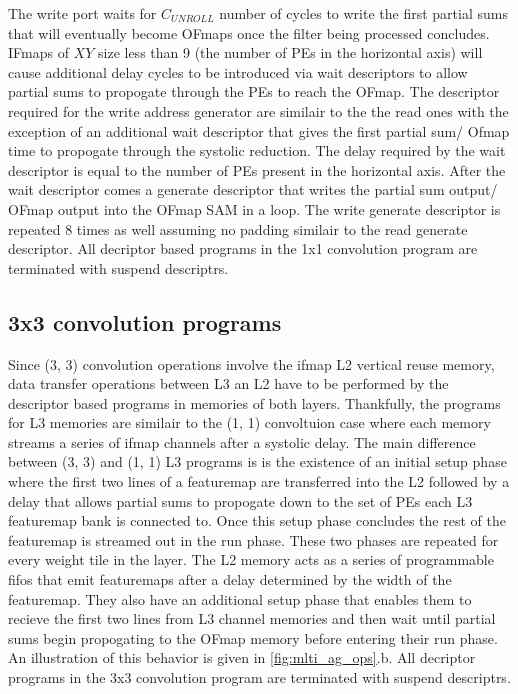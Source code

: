 The write port waits for $C_{UNROLL}$ number of cycles to write the first
partial sums that will eventually become OFmaps once the filter being processed
concludes. IFmaps of $XY$ size less than 9 (the number of PEs in the horizontal
axis) will cause additional delay cycles to be introduced via wait descriptors
to allow partial sums to propogate through the PEs to reach the OFmap.
 The descriptor required for
the write address generator are similair to the the read ones with the exception
of an additional wait descriptor that gives the first partial sum/ Ofmap time to
propogate through the systolic reduction. The delay required by the wait
descriptor is equal to the number of PEs present in the horizontal axis. After
the wait descriptor comes a generate descriptor that writes the partial sum
output/ OFmap output into the OFmap SAM in a loop. The write generate
descriptor is repeated 8 times as well assuming no padding similair to
the read generate descriptor. All decriptor based programs in the 1x1
convolution program are terminated with suspend descriptrs. 

\subsection{3x3 convolution programs}
\label{chap:sams:acc_scheduling:3x3}

Since (3, 3) convolution operations involve the ifmap L2 vertical reuse memory,
data transfer operations between L3 an L2 have to be performed by the descriptor
based programs in memories of both layers. Thankfully, the programs for L3
memories are similair to the (1, 1) convoltuion case where each memory streams a
series of ifmap channels after a systolic delay. The main difference between (3,
3) and (1, 1) L3 programs is is the existence of an initial setup phase where
the first two lines of a featuremap are transferred into the L2 followed by a
delay that allows partial sums to propogate down to the set of PEs each L3
featuremap bank is connected to. Once this setup phase concludes the rest of the
featuremap is streamed out in the run phase. These two phases are repeated for
every weight tile in the layer. The L2 memory acts as a series of programmable
fifos that emit featuremaps after a delay determined by the width of the
featuremap. They also have an additional setup phase that enables them to
recieve the first two lines from L3 channel memories and then wait until partial
sums begin propogating to the OFmap memory before entering their run phase. An
illustration of this behavior is given in \autoref{fig:mlti_ag_ops}.b. All
decriptor programs in the 3x3 convolution program are terminated with suspend
descriptrs. 


